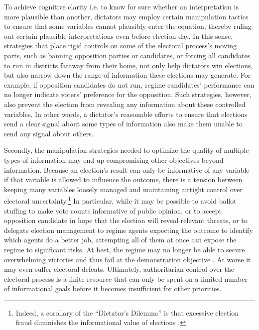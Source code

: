 \documentclass[12pt]{article}
\newcommand{\1}{\mathbbm{1}}
\begin{document}
To achieve cognitive clarity i.e. to know for sure whether an interpretation is more plausible than another, dictators may employ certain manipulation tactics to ensure that some variables cannot plausibly enter the equation, thereby ruling out certain plausible interpretations even before election day. In this sense, strategies that place rigid controls on some of the electoral process's moving parts, such as banning opposition parties or candidates, or forcing all candidates to run in districts faraway from their home, not only help dictators win elections, but also narrow down the range of information these elections may generate. For example, if opposition candidates do not run, regime candidates' performance can no longer indicate voters' preference for the opposition. Such strategies, however, also prevent the election from revealing any information about these controlled variables. In other words, a dictator's reasonable efforts to ensure that elections send a clear signal about some types of information also make them unable to send any signal about others.

Secondly, the manipulation strategies needed to optimize the quality of multiple types of information may end up compromising other objectives beyond information. Because an election's result can only be informative of any variable if that variable is allowed to influence the outcome, there is a tension between keeping many variables loosely managed and maintaining airtight control over electoral uncertainty.\footnote{Indeed, a corollary of the ``Dictator's Dilemma'' is that excessive election fraud diminishes the informational value of elections \citep{Wintrobe2000}. } In particular, while it may be possible to avoid ballot stuffing to make vote counts informative of public opinion, or to accept opposition candidate in hope that the election will reveal relevant threats, or to delegate election management to regime agents expecting the outcome to identify which agents do a better job, attempting all of them at once can expose the regime to significant risks. At best, the regime may no longer be able to secure overwhelming victories and thus fail at the demonstration objective \citep{Geddes2005}. At worse it may even suffer electoral defeats. Ultimately, authoritarian control over the electoral process is a finite resource that can only be spent on a limited number of informational goals before it becomes insufficient for other priorities.
\end{document}

